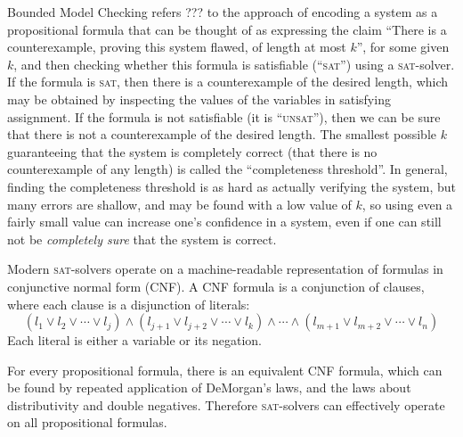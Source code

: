 \documentclass[11pt]{article}
\begin{document}
Bounded Model Checking refers ??? to the approach of encoding a system as a propositional formula that can be thought of as expressing the claim ``There is a counterexample, proving this system flawed, of length at most $k$'', for some given $k$, and then checking whether this formula is satisfiable (``\textsc{sat}'') using a \textsc{sat}-solver. If the formula is \textsc{sat}, then there is a counterexample of the desired length, which may be obtained by inspecting the values of the variables in satisfying assignment. If the formula is not satisfiable (it is ``\textsc{unsat}''), then we can be sure that there is not a counterexample of the desired length. The smallest possible $k$ guaranteeing that the system is completely correct (that there is no counterexample of any length) is called the ``completeness threshold''. In general, finding the completeness threshold is as hard as actually verifying the system, but many errors are shallow, and may be found with a low value of $k$, so using even a fairly small value can increase one's confidence in a system, even if one can still not be \emph{completely sure} that the system is correct.

Modern \textsc{sat}-solvers operate on a machine-readable representation of formulas in conjunctive normal form (CNF). A CNF formula is a conjunction of clauses, where each clause is a disjunction of literals:
$$(l_1 \vee l_2 \vee \cdots \vee l_j) \wedge (l_{j+1} \vee l_{j+2} \vee \cdots \vee l_k) \wedge \cdots \wedge (l_{m+1} \vee l_{m+2} \vee \cdots \vee l_n)$$
Each literal is either a variable or its negation.

For every propositional formula, there is an equivalent CNF formula, which can be found by repeated application of DeMorgan's laws, and the laws about distributivity and double negatives. Therefore \textsc{sat}-solvers can effectively operate on all propositional formulas.
\end{document}

